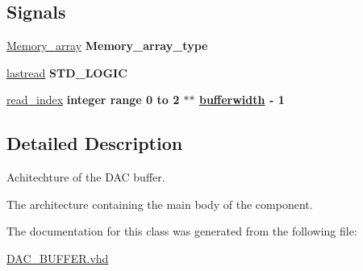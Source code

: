 \subsection*{Signals}
 \begin{DoxyCompactItemize}
\item 
\hypertarget{classDAC__buffer_1_1Behavioral_aa3242fe5cbe81a6710bd0ed34005d4ef}{\hyperlink{classDAC__buffer_1_1Behavioral_aa3242fe5cbe81a6710bd0ed34005d4ef}{Memory\-\_\-array} {\bfseries \textcolor{vhdlchar}{Memory\-\_\-array\-\_\-type}\textcolor{vhdlchar}{ }} }\label{classDAC__buffer_1_1Behavioral_aa3242fe5cbe81a6710bd0ed34005d4ef}

\item 
\hypertarget{classDAC__buffer_1_1Behavioral_a112659537d3ba8eb606d42ca2df463ba}{\hyperlink{classDAC__buffer_1_1Behavioral_a112659537d3ba8eb606d42ca2df463ba}{lastread} {\bfseries \textcolor{comment}{S\-T\-D\-\_\-\-L\-O\-G\-I\-C}\textcolor{vhdlchar}{ }} }\label{classDAC__buffer_1_1Behavioral_a112659537d3ba8eb606d42ca2df463ba}

\item 
\hypertarget{classDAC__buffer_1_1Behavioral_a902704851875fe125eaa6f1b125dfd0f}{\hyperlink{classDAC__buffer_1_1Behavioral_a902704851875fe125eaa6f1b125dfd0f}{read\-\_\-index} {\bfseries \textcolor{comment}{integer}\textcolor{vhdlchar}{ }\textcolor{vhdlkeyword}{range}\textcolor{vhdlchar}{ } \textcolor{vhdldigit}{0} \textcolor{vhdlchar}{ }\textcolor{vhdlchar}{ }\textcolor{vhdlchar}{ }\textcolor{vhdlkeyword}{to}\textcolor{vhdlchar}{ }\textcolor{vhdlchar}{ }\textcolor{vhdlchar}{ } \textcolor{vhdldigit}{2} \textcolor{vhdlchar}{ }\textcolor{vhdlchar}{$\ast$}\textcolor{vhdlchar}{$\ast$}\textcolor{vhdlchar}{ }{\bfseries \hyperlink{classDAC__buffer_a2f94b7b31a8914ee23be5e000f89e921}{bufferwidth}} \textcolor{vhdlchar}{ }\textcolor{vhdlchar}{-\/}\textcolor{vhdlchar}{ } \textcolor{vhdldigit}{1} \textcolor{vhdlchar}{ }} }\label{classDAC__buffer_1_1Behavioral_a902704851875fe125eaa6f1b125dfd0f}

\end{DoxyCompactItemize}


\subsection{Detailed Description}
Achitechture of the D\-A\-C buffer. 

The architecture containing the main body of the component. 

The documentation for this class was generated from the following file\-:\begin{DoxyCompactItemize}
\item 
\hyperlink{DAC__BUFFER_8vhd}{D\-A\-C\-\_\-\-B\-U\-F\-F\-E\-R.\-vhd}\end{DoxyCompactItemize}
